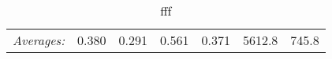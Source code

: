 \begin{table}
{\begin{tabular}{cc|ccccrr}
\multicolumn{2}{r|}{\textit{\scriptsize{Averages:}}} & 0.380 & 0.291 & 0.561 & 0.371 & 5612.8 & 745.8 \\
 \end{tabular}
}
 \caption{fff}
 \label{tab:intr-1000}
\end{table}


